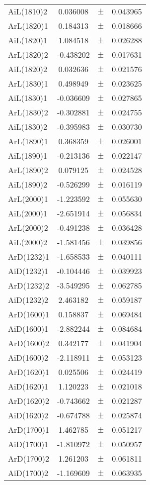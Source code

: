 \begin{table}
\begin{tiny}
\begin{tabular}{lccc}
AiL(1810)2 & 0.036008 & $\pm$ & 0.043965 \\
ArL(1820)1 & 0.184313 & $\pm$ & 0.018666 \\
AiL(1820)1 & 1.084518 & $\pm$ & 0.026288 \\
ArL(1820)2 & -0.438202 & $\pm$ & 0.017631 \\
AiL(1820)2 & 0.032636 & $\pm$ & 0.021576 \\
ArL(1830)1 & 0.498949 & $\pm$ & 0.023625 \\
AiL(1830)1 & -0.036609 & $\pm$ & 0.027865 \\
ArL(1830)2 & -0.302881 & $\pm$ & 0.024755 \\
AiL(1830)2 & -0.395983 & $\pm$ & 0.030730 \\
ArL(1890)1 & 0.368359 & $\pm$ & 0.026001 \\
AiL(1890)1 & -0.213136 & $\pm$ & 0.022147 \\
ArL(1890)2 & 0.079125 & $\pm$ & 0.024528 \\
AiL(1890)2 & -0.526299 & $\pm$ & 0.016119 \\
ArL(2000)1 & -1.223592 & $\pm$ & 0.055630 \\
AiL(2000)1 & -2.651914 & $\pm$ & 0.056834 \\
ArL(2000)2 & -0.491238 & $\pm$ & 0.036428 \\
AiL(2000)2 & -1.581456 & $\pm$ & 0.039856 \\
ArD(1232)1 & -1.658533 & $\pm$ & 0.040111 \\
AiD(1232)1 & -0.104446 & $\pm$ & 0.039923 \\
ArD(1232)2 & -3.549295 & $\pm$ & 0.062785 \\
AiD(1232)2 & 2.463182 & $\pm$ & 0.059187 \\
ArD(1600)1 & 0.158837 & $\pm$ & 0.069484 \\
AiD(1600)1 & -2.882244 & $\pm$ & 0.084684 \\
ArD(1600)2 & 0.342177 & $\pm$ & 0.041904 \\
AiD(1600)2 & -2.118911 & $\pm$ & 0.053123 \\
ArD(1620)1 & 0.025506 & $\pm$ & 0.024419 \\
AiD(1620)1 & 1.120223 & $\pm$ & 0.021018 \\
ArD(1620)2 & -0.743662 & $\pm$ & 0.021287 \\
AiD(1620)2 & -0.674788 & $\pm$ & 0.025874 \\
ArD(1700)1 & 1.462785 & $\pm$ & 0.051217 \\
AiD(1700)1 & -1.810972 & $\pm$ & 0.050957 \\
ArD(1700)2 & 1.261203 & $\pm$ & 0.061811 \\
AiD(1700)2 & -1.169609 & $\pm$ & 0.063935 \\
\bottomrule
\end{tabular}
\end{tiny}
\end{table}

